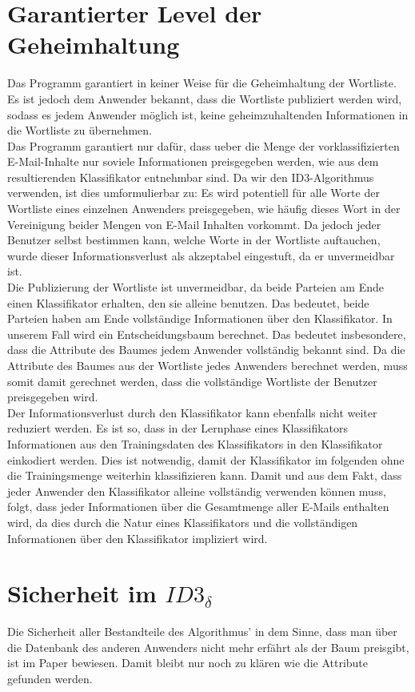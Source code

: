 \documentclass{article}
\begin{document}
\section{Garantierter Level der Geheimhaltung}
  Das Programm garantiert in keiner Weise f\"ur die Geheimhaltung der
Wortliste. Es ist jedoch dem Anwender bekannt, dass die Wortliste publiziert
werden wird, sodass es jedem Anwender m\"oglich ist, keine geheimzuhaltenden
Informationen in die Wortliste zu \"ubernehmen.\\
  Das Programm garantiert nur daf\"ur, dass ueber die Menge der
vorklassifizierten E-Mail-Inhalte nur soviele Informationen preisgegeben
werden, wie aus dem resultierenden Klassifikator entnehmbar sind. Da
wir den ID3-Algorithmus verwenden, ist dies umformulierbar zu: Es wird 
potentiell f\"ur alle Worte der Wortliste eines einzelnen Anwenders 
preisgegeben, wie h\"aufig dieses Wort in der Vereinigung beider 
Mengen von E-Mail Inhalten vorkommt.
  Da jedoch jeder Benutzer selbst bestimmen kann, welche Worte in der 
Wortliste auftauchen, wurde dieser Informationsverlust als akzeptabel 
eingestuft, da er unvermeidbar ist.\\
  Die Publizierung der Wortliste ist unvermeidbar, da beide Parteien am
Ende einen Klassifikator erhalten, den sie alleine benutzen.
Das bedeutet, beide Parteien haben am Ende vollst\"andige Informationen
\"uber den Klassifikator.
  In unserem Fall wird ein Entscheidungsbaum berechnet. 
  Das bedeutet insbesondere, dass die Attribute des Baumes jedem Anwender
vollst\"andig bekannt sind.
  Da die Attribute des Baumes aus der Wortliste jedes Anwenders berechnet
werden, muss somit damit gerechnet werden, dass die vollst\"andige
Wortliste der Benutzer preisgegeben wird.\\
  Der Informationsverlust durch den Klassifikator kann ebenfalls nicht 
weiter reduziert werden.
  Es ist so, dass in der Lernphase eines Klassifikators Informationen aus
den Trainingsdaten des Klassifikators in den Klassifikator einkodiert
werden.
  Dies ist notwendig, damit der Klassifikator im folgenden ohne die
Trainingsmenge weiterhin klassifizieren kann.
  Damit und aus dem Fakt, dass jeder Anwender den Klassifikator alleine
vollst\"andig verwenden k\"onnen muss, folgt, dass jeder Informationen
\"uber die Gesamtmenge aller E-Mails enthalten wird, da dies durch die 
Natur eines Klassifikators und die vollst\"andigen Informationen \"uber
den Klassifikator impliziert wird.

\section{Sicherheit im \(ID3_\delta\)}
Die Sicherheit aller Bestandteile des Algorithmus' in dem Sinne, dass man \"uber
die Datenbank des anderen Anwenders nicht mehr erf\"ahrt als der Baum preisgibt,
ist im Paper bewiesen. Damit bleibt nur noch zu kl\"aren wie die Attribute
gefunden werden.
\end{document}
